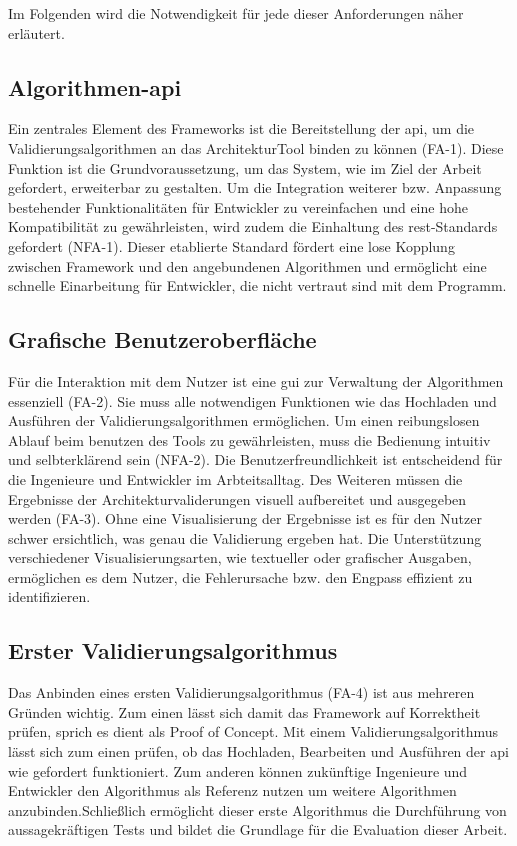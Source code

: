 Im Folgenden wird die Notwendigkeit für jede dieser Anforderungen näher erläutert.

\subsection*{Algorithmen-\gls{api}}

Ein zentrales Element des Frameworks ist die Bereitstellung der \gls{api}, um die Validierungsalgorithmen an das ArchitekturTool binden zu können (FA-1). Diese Funktion ist die Grundvoraussetzung, um das System, wie im Ziel der Arbeit gefordert, erweiterbar zu gestalten. Um die Integration weiterer bzw. Anpassung bestehender Funktionalitäten für Entwickler zu vereinfachen und eine hohe Kompatibilität zu gewährleisten, wird zudem die Einhaltung des \gls{rest}-Standards gefordert (NFA-1). Dieser etablierte Standard fördert eine lose Kopplung zwischen Framework und den angebundenen Algorithmen und ermöglicht eine schnelle Einarbeitung für Entwickler, die nicht vertraut sind mit dem Programm.

\subsection*{Grafische Benutzeroberfläche}

Für die Interaktion mit dem Nutzer ist eine \gls{gui} zur Verwaltung der Algorithmen essenziell (FA-2). Sie muss alle notwendigen Funktionen wie das Hochladen und Ausführen der Validierungsalgorithmen ermöglichen. Um einen reibungslosen Ablauf beim benutzen des Tools zu gewährleisten, muss die Bedienung intuitiv und selbterklärend sein (NFA-2). Die Benutzerfreundlichkeit ist entscheidend für die Ingenieure und Entwickler im Arbteitsalltag. Des Weiteren müssen die Ergebnisse der Architekturvaliderungen visuell aufbereitet und ausgegeben werden (FA-3). Ohne eine Visualisierung der Ergebnisse ist es für den Nutzer schwer ersichtlich, was genau die Validierung ergeben hat. Die Unterstützung verschiedener Visualisierungsarten, wie textueller oder grafischer Ausgaben, ermöglichen es dem Nutzer, die Fehlerursache bzw. den Engpass effizient zu identifizieren.

\subsection*{Erster Validierungsalgorithmus}

Das Anbinden eines ersten Validierungsalgorithmus (FA-4) ist aus mehreren Gründen wichtig. Zum einen lässt sich damit das Framework auf Korrektheit prüfen, sprich es dient als Proof of Concept. Mit einem Validierungsalgorithmus lässt sich zum einen prüfen, ob das Hochladen, Bearbeiten und Ausführen der \gls{api} wie gefordert funktioniert. Zum anderen können  zukünftige Ingenieure und Entwickler den Algorithmus als Referenz nutzen um weitere Algorithmen anzubinden.Schließlich ermöglicht dieser erste Algorithmus die Durchführung von aussagekräftigen Tests und bildet die Grundlage für die Evaluation dieser Arbeit.

